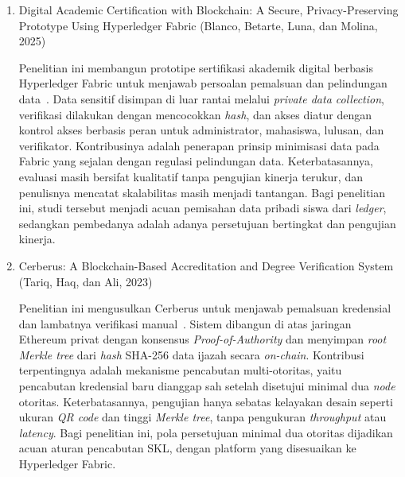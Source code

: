 \begin{enumerate}
    \item {Digital Academic Certification with Blockchain: A Secure, Privacy-Preserving Prototype Using Hyperledger Fabric (Blanco, Betarte, Luna, dan Molina, 2025)}\par
    Penelitian ini membangun prototipe sertifikasi akademik digital berbasis Hyperledger Fabric untuk menjawab persoalan pemalsuan dan pelindungan data~\cite{Blanco2025Digital}. Data sensitif disimpan di luar rantai melalui \textit{private data collection}, verifikasi dilakukan dengan mencocokkan \textit{hash}, dan akses diatur dengan kontrol akses berbasis peran untuk administrator, mahasiswa, lulusan, dan verifikator. Kontribusinya adalah penerapan prinsip minimisasi data pada Fabric yang sejalan dengan regulasi pelindungan data. Keterbatasannya, evaluasi masih bersifat kualitatif tanpa pengujian kinerja terukur, dan penulisnya mencatat skalabilitas masih menjadi tantangan. Bagi penelitian ini, studi tersebut menjadi acuan pemisahan data pribadi siswa dari \textit{ledger}, sedangkan pembedanya adalah adanya persetujuan bertingkat dan pengujian kinerja.

    \item {Cerberus: A Blockchain-Based Accreditation and Degree Verification System (Tariq, Haq, dan Ali, 2023)}\par
    Penelitian ini mengusulkan Cerberus untuk menjawab pemalsuan kredensial dan lambatnya verifikasi manual~\cite{Tariq2023Cerberus}. Sistem dibangun di atas jaringan Ethereum privat dengan konsensus \textit{Proof-of-Authority} dan menyimpan \textit{root Merkle tree} dari \textit{hash} SHA-256 data ijazah secara \textit{on-chain}. Kontribusi terpentingnya adalah mekanisme pencabutan multi-otoritas, yaitu pencabutan kredensial baru dianggap sah setelah disetujui minimal dua \textit{node} otoritas. Keterbatasannya, pengujian hanya sebatas kelayakan desain seperti ukuran \textit{QR code} dan tinggi \textit{Merkle tree}, tanpa pengukuran \textit{throughput} atau \textit{latency}. Bagi penelitian ini, pola persetujuan minimal dua otoritas dijadikan acuan aturan pencabutan SKL, dengan platform yang disesuaikan ke Hyperledger Fabric.


\end{enumerate}
